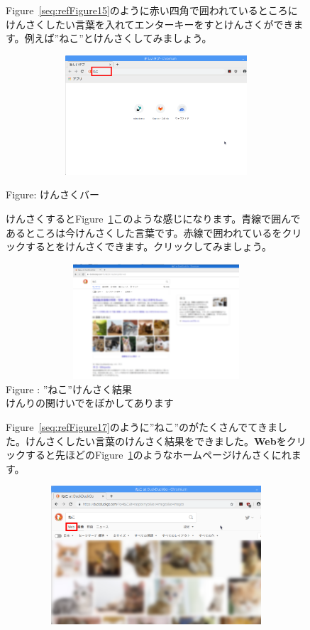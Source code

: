 \documentclass[a4paper,12pt]{jarticle}
\begin{document}
\begin{figure}
  Figure~\ref{seq:refFigure15}のように赤い四角で囲われているところにけんさくしたい言葉を入れてエンターキーをすとけんさくができます。例えば”ねこ”とけんさくしてみましょう。
  \centering
  {\upshape
    \includegraphics[width=12.023cm,height=4.447cm]{textbook-img077.png}

    Figure{\theFigure\label{seq:refFigure15}}: けんさくバー}


  \flushleft
  けんさくするとFigure~\ref{seq:refFigure16}このような感じになります。青線で囲んであるところは今けんさくした言葉です。赤線で囲われている\textbf{}をクリックするとをけんさくできます。クリックしてみましょう。


  \centering
  {\upshape
    \includegraphics[width=12.123cm,height=4.299cm]{textbook-img078.png}
    \newline
    Figure {\theFigure\label{seq:refFigure16}}:
    ”ねこ”けんさく結果\\
    けんりの関けいでをぼかしてあります}

  \flushleft
  Figure~\ref{seq:refFigure17}のように”ねこ”のがたくさんでてきました。けんさくしたい言葉のけんさく結果をできました。\textbf{Web}をクリックすると先ほどのFigure~\ref{seq:refFigure16}のようなホームページけんさくにれます。


  \centering
  \begin{minipage}{13.762cm}
    \includegraphics[width=13.892cm,height=5.156cm]{textbook-img079.png}


\end{minipage}
\end{figure}
\end{document}
